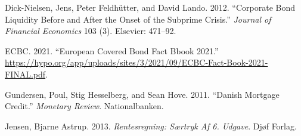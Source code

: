 \documentclass[12pt,twoside]{reedthesis}
\newlength{\cslhangindent}
\newenvironment{CSLReferences}[2] %
 {%
  \setlength{\parindent}{0pt}
  \ifodd #1 \everypar{\setlength{\hangindent}{\cslhangindent}}\ignorespaces\fi
  \ifnum #2 > 0
  \setlength{\parskip}{#2\baselineskip}
  \fi
 }%
 {}
\begin{document}
\hypertarget{refs}{}
\begin{CSLReferences}{1}{0}
\leavevmode{}%
Dick-Nielsen, Jens, Peter Feldhütter, and David Lando. 2012. {``Corporate Bond Liquidity Before and After the Onset of the Subprime Crisis.''} \emph{Journal of Financial Economics} 103 (3). Elsevier: 471--92.

\leavevmode{}%
ECBC. 2021. {``European Covered Bond Fact Bbook 2021.''} \url{https://hypo.org/app/uploads/sites/3/2021/09/ECBC-Fact-Book-2021-FINAL.pdf}.

\leavevmode{}%
Gundersen, Poul, Stig Hesselberg, and Sean Hove. 2011. {``Danish Mortgage Credit.''} \emph{Monetary Review}. Nationalbanken.

\leavevmode{}%
Jensen, Bjarne Astrup. 2013. \emph{Rentesregning: S{æ}rtryk Af 6. Udgave}. Dj{ø}f Forlag.

\end{CSLReferences}

\end{document}
